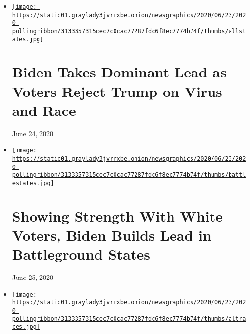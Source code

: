 \begin{itemize}
\item
  \href{https://www.nytimes3xbfgragh.onion/2020/06/24/us/politics/trump-biden-poll-nyt-upshot-siena-college.html}{\texttt{[image: https://static01.graylady3jvrrxbe.onion/newsgraphics/2020/06/23/2020-pollingribbon/3133357315cec7c0cac77287fdc6f8ec7774b74f/thumbs/allstates.jpg]}}

  \href{https://www.nytimes3xbfgragh.onion/2020/06/24/us/politics/trump-biden-poll-nyt-upshot-siena-college.html}{}

  \hypertarget{biden-takes-dominant-lead-as-voters-reject-trump-on-virus-and-race-1}{%
  \section{Biden Takes Dominant Lead as Voters Reject Trump on Virus and
  Race}\label{biden-takes-dominant-lead-as-voters-reject-trump-on-virus-and-race-1}}

  June 24, 2020
\item
  \href{https://www.nytimes3xbfgragh.onion/2020/06/25/upshot/poll-2020-biden-battlegrounds.html}{\texttt{[image: https://static01.graylady3jvrrxbe.onion/newsgraphics/2020/06/23/2020-pollingribbon/3133357315cec7c0cac77287fdc6f8ec7774b74f/thumbs/battlestates.jpg]}}

  \href{https://www.nytimes3xbfgragh.onion/2020/06/25/upshot/poll-2020-biden-battlegrounds.html}{}

  \hypertarget{showing-strength-with-white-voters-biden-builds-lead-in-battleground-states}{%
  \section{Showing Strength With White Voters, Biden Builds Lead in
  Battleground
  States}\label{showing-strength-with-white-voters-biden-builds-lead-in-battleground-states}}

  June 25, 2020
\item
  \href{https://www.nytimes3xbfgragh.onion/2020/06/25/us/politics/trump-senate-republicans-poll.html}{\texttt{[image: https://static01.graylady3jvrrxbe.onion/newsgraphics/2020/06/23/2020-pollingribbon/3133357315cec7c0cac77287fdc6f8ec7774b74f/thumbs/altraces.jpg]}}

  \href{https://www.nytimes3xbfgragh.onion/2020/06/25/us/politics/trump-senate-republicans-poll.html}{}

  \hypertarget{trumps-sagging-popularity-drags-down-republican-senate-candidates}{%
}
\end{itemize}
